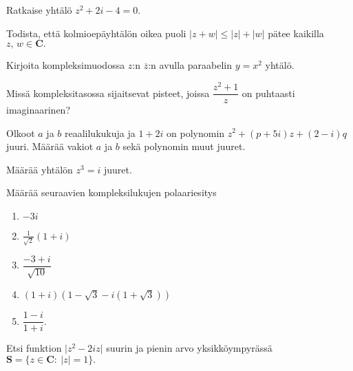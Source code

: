 \documentclass[a4paper, 12pt]{article}
\theoremstyle{remark}
\theoremstyle{definition}
\renewcommand{\bar}[1]{\overline{#1}}
\newcommand{\abs}[1]{\lvert#1\rvert}
\begin{document}
\begin{teht}
Ratkaise yhtälö $z^2+2i-4=0.$
\end{teht}



\begin{teht} Todista, että kolmioepäyhtälön oikea puoli
$\left\lvert z+w\right\rvert \leq \abs{z}+\abs{w}$ 
pätee kaikilla $z,\, w\in\mathbf{C}.$
\end{teht}

\begin{teht} Kirjoita kompleksimuodossa $z$:n $\bar{z}$:n avulla paraabelin $y=x^2$ yhtälö.
\end{teht}

\begin{teht} Missä kompleksitasossa sijaitsevat pisteet, joissa $\dfrac{z^2+1}{z}$ on puhtaasti imaginaarinen?

\end{teht}

\begin{teht}
Olkoot $a$ ja $b$ reaalilukukuja ja $1+2i$ on polynomin $z^2+(p+5i)z+(2-i)q$ juuri. Määrää
vakiot $a$ ja $b$ sekä polynomin muut juuret.
\end{teht}

\begin{teht}
Määrää yhtälön $z^3=i$ juuret.
\end{teht}

\begin{teht}
Määrää seuraavien kompleksilukujen polaariesitys
\begin{enumerate}[leftmargin=*, label=\roman*), topsep=0pt, itemsep=12pt, parsep=0pt, font=\small\bfseries\color{blue}] 
\item $-3i$

\item $\displaystyle \frac{1}{\sqrt{2}}\left(1+i\right)$

\item $\dfrac{-3+i}{\sqrt{10}}$

\item $(1+i)\left(1-\sqrt{3}-i(1+\sqrt{3})\right)$

\item $\dfrac{1-i}{1+i}.$
\end{enumerate}

\end{teht}

\begin{teht}
Etsi funktion $\abs{z^2-2iz}$ suurin ja pienin arvo yksikköympyrässä $\mathbf{S}=\{z\in\mathbf{C}: \ \abs{z}=1\}.$
\end{teht}
\end{document}
